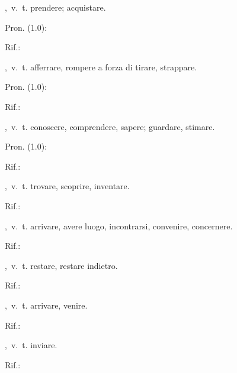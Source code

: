 ,\ v.\ t.
prendere; acquistare.
\begin{subvocedue}
\item[Pron. (1.0):] 
\item[Rif.:] 
\end{subvocedue}
,\ v.\ t.
afferrare, rompere a forza di tirare, strappare.
\begin{subvocedue}
\item[Pron. (1.0):] 
\item[Rif.:] 
\end{subvocedue}
,\ v.\ t.
conoscere, comprendere, sapere; guardare, stimare.
\begin{subvocedue}
\item[Pron. (1.0):] 
\item[Rif.:] 
\end{subvocedue}
,\ v.\ t.
trovare, scoprire, inventare.
\begin{subvocedue}
\item[Rif.:] 
\end{subvocedue}
,\ v.\ t.
arrivare, avere luogo, incontrarsi, convenire, concernere.
\begin{subvocedue}
\item[Rif.:] 
\end{subvocedue}
,\ v.\ t.
restare, restare indietro.
\begin{subvocedue}
\item[Rif.:] 
\end{subvocedue}
,\ v.\ t.
arrivare, venire.
\begin{subvocedue}
\item[Rif.:] 
\end{subvocedue}
,\ v.\ t.
inviare.
\begin{subvocedue}
\item[Rif.:] 
\end{subvocedue}
